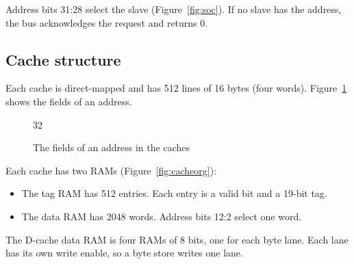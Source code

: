 Address bits 31:28 select the slave (Figure~\ref{fig:soc}). If no slave has the address, the bus acknowledges the request and returns 0.

\subsection{Cache structure}

Each cache is direct-mapped and has 512 lines of 16 bytes (four words). Figure~\ref{fig:cachesplit} shows the fields of an address.

\begin{figure}[H]
  \centering
  \begin{bitfield}{32}
  \end{bitfield}
  \caption{The fields of an address in the caches}
  \label{fig:cachesplit}
\end{figure}

Each cache has two RAMs (Figure~\ref{fig:cacheorg}):

\begin{itemize}
  \item The tag RAM has 512 entries. Each entry is a valid bit and a 19-bit tag.
  \item The data RAM has 2048 words. Address bits 12:2 select one word.
\end{itemize}

The D-cache data RAM is four RAMs of 8 bits, one for each byte lane. Each lane has its own write enable, so a byte store writes one lane.

